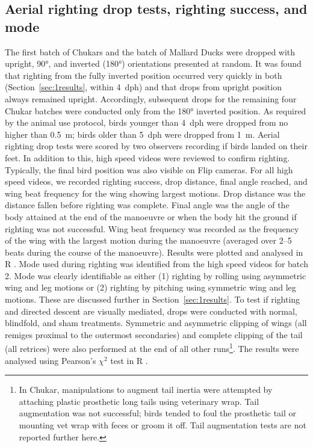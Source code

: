 \documentclass[10pt]{article}
\begin{document}
\subsection{Aerial righting drop tests, righting success, and mode}
The first batch of Chukars and the batch of Mallard Ducks were dropped with upright, \ang{90}, and inverted (\ang{180}) orientations presented at random.  It was found that righting from the fully inverted position occurred very quickly in both (Section~\ref{sec:1results}, within \SI{4}{dph}) and that drops from upright position always remained upright.  Accordingly, subsequent drops for the remaining four Chukar batches were conducted only from the \ang{180} inverted position.  As required by the animal use protocol, birds younger than \SI{4}{dph} were dropped from no higher than \SI{0.5}{\meter}; birds older than \SI{5}{dph} were dropped from \SI{1}{\meter}. 
	Aerial righting drop tests were scored by two observers recording if birds landed on their feet. In addition to this, high speed videos were reviewed to confirm righting.  Typically, the final bird position was also visible on Flip cameras.  For all high speed videos, we recorded righting success, drop distance, final angle reached, and wing beat frequency for the wing showing largest motions.  Drop distance was the distance fallen before righting was complete.  Final angle was the angle of the body attained at the end of the manoeuvre or when the body hit the ground if righting was not successful.  Wing beat frequency was recorded as the frequency of the wing with the largest motion during the manoeuvre (averaged over \numrange{2}{5} beats during the course of the manoeuvre).  Results were plotted and analysed in R \citep{R:2013}. 
	Mode used during righting was identified from the high speed videos for batch 2.  Mode was clearly identifiable as either (1) righting by rolling using asymmetric wing and leg motions or (2) righting by pitching using symmetric wing and leg motions.  These are discussed further in Section~\ref{sec:1results}. 
	To test if righting and directed descent are visually mediated, drops were conducted with normal, blindfold, and sham treatments.  Symmetric and asymmetric clipping of wings (all remiges proximal to the outermost secondaries) and complete clipping of the tail (all retrices) were also performed at the end of all other runs\footnote{In Chukar, manipulations to augment tail inertia were attempted by attaching plastic prosthetic long tails using veterinary wrap.  Tail augmentation was not successful; birds tended to foul the prosthetic tail or mounting vet wrap with feces or groom it off. Tail augmentation tests are not reported further here.}.  The results were analysed using Pearson's $\chi^2$ test in R \citep{R:2013}.
\end{document}
